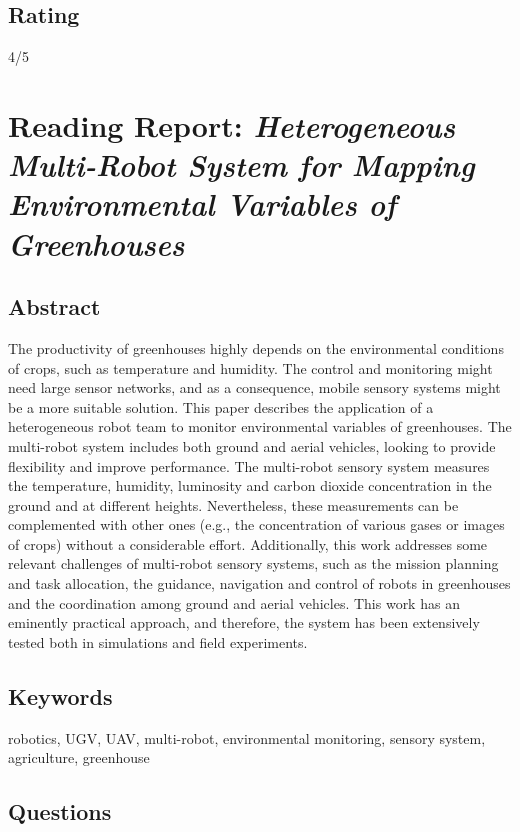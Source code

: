 \documentclass{article}
\begin{document}
\subsection*{Rating}
4/5



\section{Reading Report: \emph{Heterogeneous Multi-Robot System for Mapping Environmental Variables of Greenhouses}}
\cite{Roldan2016}

\subsection*{Abstract}
The productivity of greenhouses highly depends on the environmental conditions of crops,
such as temperature and humidity. The control and monitoring might need large sensor networks,
and as a consequence, mobile sensory systems might be a more suitable solution. This paper describes
the application of a heterogeneous robot team to monitor environmental variables of greenhouses.
The multi-robot system includes both ground and aerial vehicles, looking to provide flexibility
and improve performance. The multi-robot sensory system measures the temperature, humidity,
luminosity and carbon dioxide concentration in the ground and at different heights. Nevertheless,
these measurements can be complemented with other ones (e.g., the concentration of various
gases or images of crops) without a considerable effort. Additionally, this work addresses some
relevant challenges of multi-robot sensory systems, such as the mission planning and task allocation,
the guidance, navigation and control of robots in greenhouses and the coordination among ground
and aerial vehicles. This work has an eminently practical approach, and therefore, the system has
been extensively tested both in simulations and field experiments.


\subsection*{Keywords}
robotics, UGV, UAV, multi-robot, environmental monitoring, sensory system, agriculture, greenhouse


\subsection*{Questions}
\end{document}
